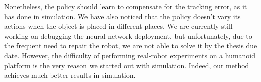 Nonetheless, the policy should learn to compensate for the tracking error, as it has done in simulation. We have also noticed that the policy doesn't vary its actions when the object is placed in different places. We are currently still working on debugging the neural network deployment, but unfortunately, due to the frequent need to repair the robot, we are not able to solve it by the thesis due date. However, the difficulty of performing real-robot experiments on a humanoid platform is the very reason we started out with simulation. Indeed, our method achieves much better results in simulation.
